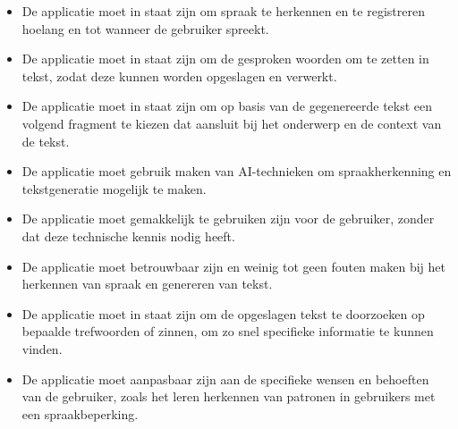 \begin{itemize}
    \item De applicatie moet in staat zijn om spraak te herkennen en te registreren hoelang en tot wanneer de gebruiker spreekt.
    \item De applicatie moet in staat zijn om de gesproken woorden om te zetten in tekst, zodat deze kunnen worden opgeslagen en verwerkt.
    \item De applicatie moet in staat zijn om op basis van de gegenereerde tekst een volgend fragment te kiezen dat aansluit bij het onderwerp en de context van de tekst.
    \item De applicatie moet gebruik maken van AI-technieken om spraakherkenning en tekstgeneratie mogelijk te maken.
    \item De applicatie moet gemakkelijk te gebruiken zijn voor de gebruiker, zonder dat deze technische kennis nodig heeft.
    \item De applicatie moet betrouwbaar zijn en weinig tot geen fouten maken bij het herkennen van spraak en genereren van tekst.
    \item  De applicatie moet in staat zijn om de opgeslagen tekst te doorzoeken op bepaalde trefwoorden of zinnen, om zo snel specifieke informatie te kunnen vinden.
    \item De applicatie moet aanpasbaar zijn aan de specifieke wensen en behoeften van de gebruiker, zoals het leren herkennen van patronen in gebruikers met een spraakbeperking.
\end{itemize}

\subsection{}

